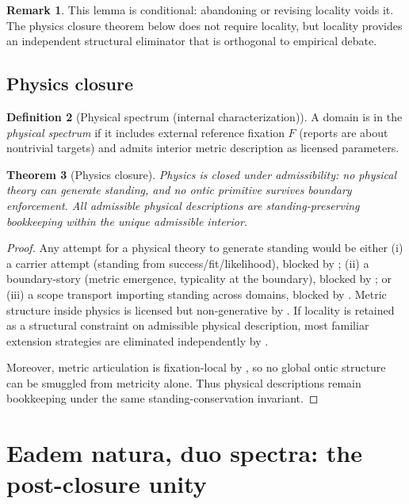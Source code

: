 \documentclass[11pt]{article}
\newtheorem{theorem}{Theorem}[section]
\theoremstyle{definition}
\newtheorem{definition}[theorem]{Definition}
\newtheorem{remark}[theorem]{Remark}
\begin{document}
\begin{remark}
This lemma is conditional: abandoning or revising locality voids it.
The physics closure theorem below does not require locality, but locality provides an independent structural eliminator that is orthogonal to empirical debate.
\end{remark}

\subsection{Physics closure}

\begin{definition}[Physical spectrum (internal characterization)]
A domain is in the \emph{physical spectrum} if it includes external reference fixation $F$ (reports are about nontrivial targets) and admits interior metric description as licensed parameters.
\end{definition}

\begin{theorem}[Physics closure]
\label{thm:physics-closed}
Physics is closed under admissibility: no physical theory can generate standing, and no ontic primitive survives boundary enforcement.
All admissible physical descriptions are standing-preserving bookkeeping within the unique admissible interior.
\end{theorem}

\begin{proof}
Any attempt for a physical theory to generate standing would be either (i) a carrier attempt (standing from success/fit/likelihood), blocked by ;
(ii) a boundary-story (metric emergence, typicality at the boundary), blocked by ;
or (iii) a scope transport importing standing across domains, blocked by .
Metric structure inside physics is licensed but non-generative by .
If locality is retained as a structural constraint on admissible physical description, most familiar extension strategies are eliminated independently by .

Moreover, metric articulation is fixation-local by , so no global ontic structure can be smuggled from metricity alone.
Thus physical descriptions remain bookkeeping under the same standing-conservation invariant.
\end{proof}

\section{Eadem natura, duo spectra: the post-closure unity}
\label{sec:eadem}
\end{document}
